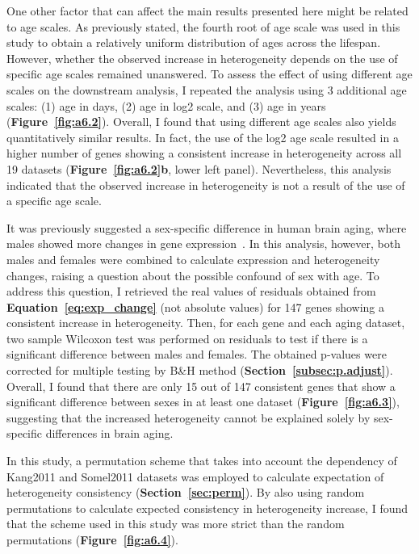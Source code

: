 One other factor that can affect the main results presented here might be related to age scales.
As previously stated, the fourth root of age scale was used in this study to obtain a relatively uniform distribution of ages across the lifespan.
However, whether the observed increase in heterogeneity depends on the use of specific age scales remained unanswered.
To assess the effect of using different age scales on the downstream analysis, I repeated the analysis using 3 additional age scales: 
(1) age in days, (2) age in log2 scale, and (3) age in years (\textbf{Figure~\ref{fig:a6.2}}).
Overall, I found that using different age scales also yields quantitatively similar results.
In fact, the use of the log2 age scale resulted in a higher number of genes showing a consistent increase in heterogeneity across all 19 datasets (\textbf{Figure~\ref{fig:a6.2}b}, lower left panel).
Nevertheless, this analysis indicated that the observed increase in heterogeneity is not a result of the use of a specific age scale.

It was previously suggested a sex-specific difference in human brain aging, where males showed more changes in gene expression~\cite{Berchtold2008}.
In this analysis, however, both males and females were combined to calculate expression and heterogeneity changes, raising a question about the possible confound of sex with age.
To address this question, I retrieved the real values of residuals obtained from \textbf{Equation~\ref{eq:exp_change}} 
(not absolute values) for 147 genes showing a consistent increase in heterogeneity.
Then, for each gene and each aging dataset, two sample Wilcoxon test was performed on residuals to test if there is a significant difference between males and females.
The obtained p-values were corrected for multiple testing by B{\&}H method (\textbf{Section~\ref{subsec:p.adjust}}).
Overall, I found that there are only 15 out of 147 consistent genes that show a significant difference between sexes in at least one dataset (\textbf{Figure~\ref{fig:a6.3}}),
suggesting that the increased heterogeneity cannot be explained solely by sex-specific differences in brain aging.

In this study, a permutation scheme that takes into account the dependency of Kang2011 and Somel2011 
datasets was employed to calculate expectation of heterogeneity consistency (\textbf{Section~\ref{sec:perm}}).
By also using random permutations to calculate expected consistency in heterogeneity increase, 
I found that the scheme used in this study was more strict than the random permutations (\textbf{Figure~\ref{fig:a6.4}}).


